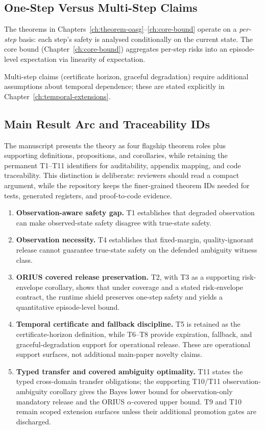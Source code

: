 \subsection{One-Step Versus Multi-Step Claims}

The theorems in Chapters~\ref{ch:theorem-oasg}--\ref{ch:core-bound}
operate on a \emph{per-step} basis: each step's safety is analysed
conditionally on the current state.  The core bound
(Chapter~\ref{ch:core-bound}) aggregates per-step risks into an
episode-level expectation via linearity of expectation.

Multi-step claims (certificate horizon, graceful degradation) require
additional assumptions about temporal dependence; these are stated
explicitly in Chapter~\ref{ch:temporal-extensions}.

\subsection{Main Result Arc and Traceability IDs}

The manuscript presents the theory as four flagship theorem roles plus
supporting definitions, propositions, and corollaries, while retaining the
permanent T1--T11 identifiers for auditability, appendix mapping, and code
traceability.  This distinction is deliberate: reviewers should read a compact
argument, while the repository keeps the finer-grained theorem IDs needed for
tests, generated registers, and proof-to-code evidence.

\begin{enumerate}
  \item \textbf{Observation-aware safety gap.}  T1 establishes that degraded
    observation can make observed-state safety disagree with true-state safety.
  \item \textbf{Observation necessity.}  T4 establishes that fixed-margin,
    quality-ignorant release cannot guarantee true-state safety on the defended
    ambiguity witness class.
  \item \textbf{ORIUS covered release preservation.}  T2, with T3 as a
    supporting risk-envelope corollary, shows that under coverage and a stated
    risk-envelope contract, the runtime shield preserves one-step safety and
    yields a quantitative episode-level bound.
  \item \textbf{Temporal certificate and fallback discipline.}  T5 is retained
    as the certificate-horizon definition, while T6--T8 provide expiration,
    fallback, and graceful-degradation support for operational release.  These
    are operational support surfaces, not additional main-paper novelty claims.
  \item \textbf{Typed transfer and covered ambiguity optimality.}  T11 states
    the typed cross-domain transfer obligations; the supporting
    T10/T11 observation-ambiguity corollary gives the Bayes lower bound for
    observation-only mandatory release and the ORIUS $\alpha$-covered upper
    bound.  T9 and T10 remain scoped extension surfaces unless their additional
    promotion gates are discharged.
\end{enumerate}

